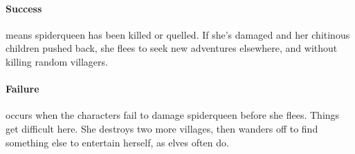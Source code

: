 \spiderqueen

\showStdSpells[
  
  
  \setcounter{enc}{3}
]

\paragraph{Success} means \gls{spiderqueen} has been killed or quelled.
If she's damaged and her chitinous children pushed back, she flees to seek new adventures elsewhere, and without killing random villagers.

\paragraph{Failure} occurs when the characters fail to damage \gls{spiderqueen} before she flees.
Things get difficult here.
She destroys two more \glspl{village}, then wanders off to find something else to entertain herself, as elves often do.

